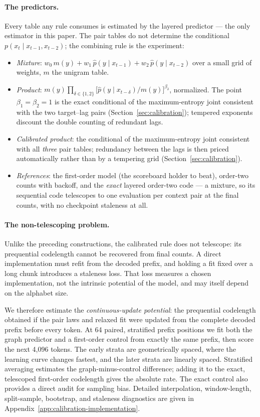 \documentclass[11pt]{article}
\begin{document}
\paragraph{The predictors.}  Every table any rule consumes is
estimated by the layered predictor --- the only estimator in this
paper.  The pair tables do not determine the conditional
$p(x_t \mid x_{t-1}, x_{t-2})$; the combining rule is the
experiment:

\begin{itemize}
\item \emph{Mixture}: $w_0\, m(y) + w_1\, \hat p(y \mid x_{t-1}) +
  w_2\, \hat p(y \mid x_{t-2})$ over a small grid of weights, $m$
  the unigram table.
\item \emph{Product}: $m(y) \prod_{\delta \in \{1,2\}}
  \bigl[\hat p(y \mid x_{t-\delta})/m(y)\bigr]^{\beta_\delta}$,
  normalized.  The point $\beta_1 = \beta_2 = 1$ is the exact
  conditional of the maximum-entropy joint consistent with the two
  target--lag pairs (Section~\ref{sec:calibration}); tempered
  exponents discount the double counting of redundant lags.
\item \emph{Calibrated product}: the conditional of the
  maximum-entropy joint consistent with all \emph{three} pair
  tables; redundancy between the lags is then priced automatically
  rather than by a tempering grid
  (Section~\ref{sec:calibration}).
\item \emph{References}: the first-order model (the scoreboard
  holder to beat), order-two counts with backoff, and the
  \emph{exact} layered order-two code --- a mixture, so its
  sequential code telescopes to one evaluation per context pair at
  the final counts, with no checkpoint staleness at all.
\end{itemize}

\paragraph{The non-telescoping problem.}
Unlike the preceding constructions, the calibrated rule does not telescope:
its prequential codelength cannot be recovered from final counts.  A direct
implementation must refit from the decoded prefix, and holding a fit fixed
over a long chunk introduces a staleness loss.  That loss measures a chosen
implementation, not the intrinsic potential of the model, and may itself
depend on the alphabet size.

We therefore estimate the \emph{continuous-update potential}: the
prequential codelength obtained if the pair laws and relaxed fit were updated
from the complete decoded prefix before every token.  At 64 paired,
stratified prefix positions we fit both the graph predictor and a first-order
control from exactly the same prefix, then score the next 4,096 tokens.  The
early strata are geometrically spaced, where the learning curve changes
fastest, and the later strata are linearly spaced.  Stratified averaging
estimates the graph-minus-control difference; adding it to the exact,
telescoped first-order codelength gives the absolute rate.  The exact control
also provides a direct audit for sampling bias.  Detailed interpolation,
window-length, split-sample, bootstrap, and staleness diagnostics are given in
Appendix~\ref{app:calibration-implementation}.
\end{document}
